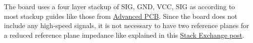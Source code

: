 The board uses a four layer stackup of SIG, GND, VCC, SIG as according to most stackup guides like those from \href{https://www.advancedpcb.com/en-us/resources/blog/understanding-4-layer-pcb-benefits-designs/}{Advanced PCB}. Since the board does not include any high-speed signals, it is not necessary to have two reference planes for a reduced reference plane impedance like explained in this \href{https://electronics.stackexchange.com/questions/41470/the-best-stack-up-possible-with-a-four-layer-pcb}{Stack Exchange post}.